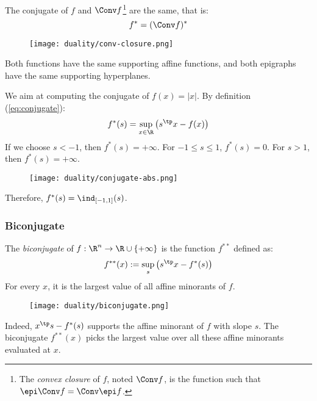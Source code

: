 \begin{property}
    The conjugate of $f$ and $\Conv f$\footnote{The \emph{convex closure} of $f$, noted $\Conv f$, is the function such that $\epi \Conv f=\Conv\epi f$.} are the same, that is:
    \begin{equation*}
        f^* = (\Conv f)^*
    \end{equation*}
    \begin{figure}[H]
        \centering
        \texttt{[image: duality/conv-closure.png]}
    \end{figure}
    Both functions have the same supporting affine functions, and both epigraphs have the same supporting hyperplanes.
\end{property}

\begin{example}
    We aim at computing the conjugate of $f(x)=|x|$. By definition (\autoref{eq:conjugate}):
    \begin{equation*}
        f^*(s) = \sup_{x\in\R}\left(s^\tp x-f(x)\right)
    \end{equation*}
    If we choose $s<-1$, then $f^*(s)=+\infty$. For $-1\leq s\leq 1$, $f^*(s)=0$. For $s>1$, then $f^*(s)=+\infty$.
    \begin{figure}[H]
        \centering
        \texttt{[image: duality/conjugate-abs.png]}
    \end{figure}
    Therefore, $f^*(s)=\ind_{[-1, 1]}(s)$.
\end{example}

\subsubsection{Biconjugate}
\begin{definition}[Biconjugate]
    The \emph{biconjugate} of $f:\R^n\to\R\cup\{+\infty\}$ is the function $f^{**}$ defined as:
    \begin{equation}
        \label{eq:biconjugate}
        f^{**}(x):=\sup_s\left(s^\tp x-f^*(s)\right)
    \end{equation}
    For every $x$, it is the largest value of all affine minorants of $f$.
    \begin{figure}[H]
        \centering
        \texttt{[image: duality/biconjugate.png]}
    \end{figure}
    Indeed, $x^\tp s-f^*(s)$ supports the affine minorant of $f$ with slope $s$. The biconjugate $f^{**}(x)$ picks the largest value over all these affine minorants evaluated at $x$.
\end{definition}


